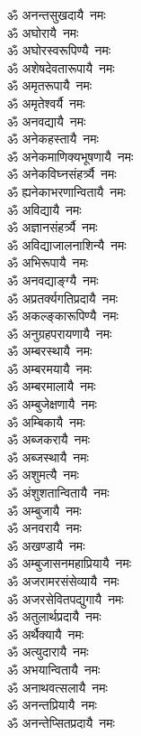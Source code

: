 \begin{flushleft}
\begin{multicols}{2}
ॐ अनन्तसुखदायै~नमः\\
ॐ अघोरायै~नमः\\
ॐ अघोरस्वरूपिण्यै~नमः\\
ॐ अशेषदेवतारूपायै~नमः\\
ॐ अमृतरूपायै~नमः\\
ॐ अमृतेश्वर्यै~नमः\\
ॐ अनवद्यायै~नमः\\
ॐ अनेकहस्तायै~नमः\hfill{}\\
ॐ अनेकमाणिक्यभूषणायै~नमः\\
ॐ अनेकविघ्नसंहर्त्र्यै~नमः\\
ॐ ह्यनेकाभरणान्वितायै~नमः\\
ॐ अविद्यायै~नमः\\
ॐ अज्ञानसंहर्त्र्यै~नमः\\
ॐ अविद्याजालनाशिन्यै~नमः\\
ॐ अभिरूपायै~नमः\\
ॐ अनवद्याङ्ग्यै~नमः\\
ॐ अप्रतर्क्यगतिप्रदायै~नमः\\
ॐ अकल्ङ्कारूपिण्यै~नमः\hfill{}\\
ॐ अनुग्रहपरायणायै~नमः\\
ॐ अम्बरस्थायै~नमः\\
ॐ अम्बरमयायै~नमः\\
ॐ अम्बरमालायै~नमः\\
ॐ अम्बुजेक्षणायै~नमः\\
ॐ अम्बिकायै~नमः\\
ॐ अब्जकरायै~नमः\\
ॐ अब्जस्थायै~नमः\\
ॐ अशुमत्यै~नमः\\
ॐ अंशुशतान्वितायै~नमः\hfill{}\\
ॐ अम्बुजायै~नमः\\
ॐ अनवरायै~नमः\\
ॐ अखण्डायै~नमः\\
ॐ अम्बुजासनमहाप्रियायै~नमः\\
ॐ अजरामरसंसेव्यायै~नमः\\
ॐ अजरसेवितपद्युगायै~नमः\\
ॐ अतुलार्थप्रदायै~नमः\\
ॐ अर्थैक्यायै~नमः\\
ॐ अत्युदारायै~नमः\\
ॐ अभयान्वितायै~नमः\hfill{}\\
ॐ अनाथवत्सलायै~नमः\\
ॐ अनन्तप्रियायै~नमः\\
ॐ अनन्तेप्सितप्रदायै~नमः\\

\end{multicols}
\end{flushleft}
